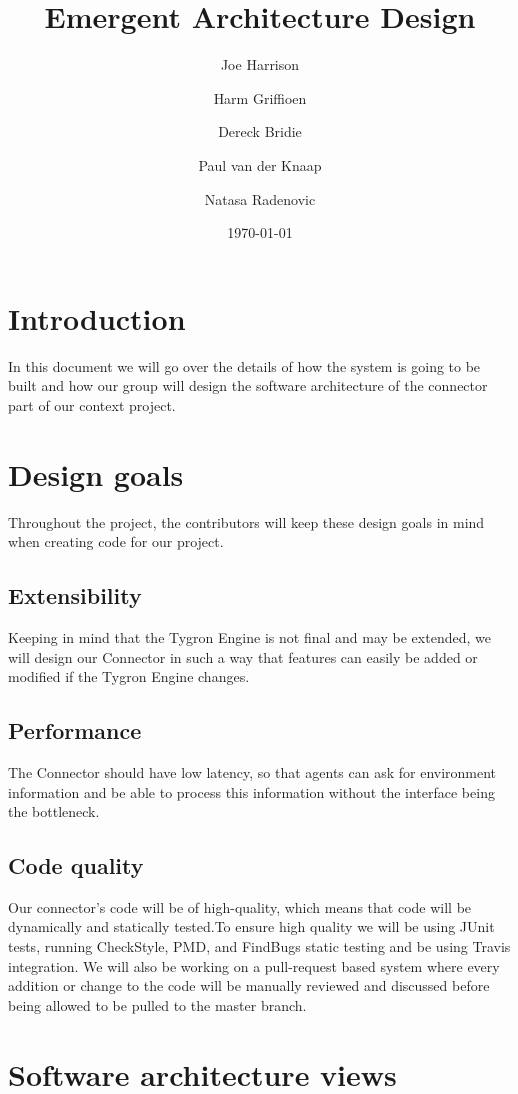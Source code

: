 \documentclass[a4paper]{article}
\title{Emergent Architecture Design}
\author{Joe Harrison \and Harm Griffioen \and Dereck Bridie \and Paul van der Knaap \and Natasa Radenovic}
\date{\today}
\begin{document}
\maketitle

\section{Introduction}
In this document we will go over the details of how the system is going to be built and how our group will design the software architecture of the connector part of our context project. 

\section{Design goals}
Throughout the project, the contributors will keep these design goals in mind when creating code for our project.

\subsection{Extensibility}
Keeping in mind that the Tygron Engine is not final and may be extended, we will design our Connector in such a way that features can easily be added or modified if the Tygron Engine changes.

\subsection{Performance}
The Connector should have low latency, so that agents can ask for environment information and be able to process this information without the interface being the bottleneck.

\subsection{Code quality}
Our connector’s code will be of high-quality, which means that code will be dynamically and statically tested.To ensure high quality we will be using JUnit tests, running CheckStyle, PMD, and FindBugs static testing and be using Travis integration. We will also be working on a pull-request based system where every addition or change to the code will be manually reviewed and discussed before being allowed to be pulled to the master branch.

\section{Software architecture views}
\end{document}
